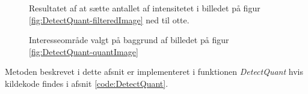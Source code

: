 \begin{figure}[htp]
  \centering
  \caption{Resultatet af at sætte antallet af intensitetet i billedet på figur \vref{fig:DetectQuant-filteredImage} ned til otte.}
  \label{fig:DetectQuant-quantImage}  
\end{figure}

\begin{figure}[htp]
  \centering
  \caption{Interesseområde valgt på baggrund af billedet på figur \vref{fig:DetectQuant-quantImage}}
  \label{fig:DetectQuant-binary}  
\end{figure}

Metoden beskrevet i dette afsnit er implementeret i funktionen \textit{DetectQuant} hvis kildekode findes i afsnit \vref{code:DetectQuant}.




